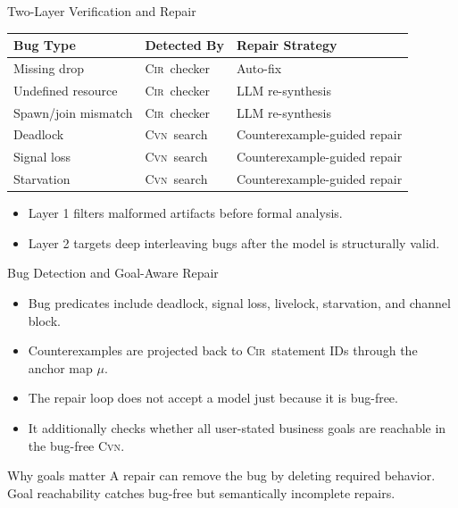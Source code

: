 \documentclass[aspectratio=169]{beamer}
\newcommand{\Cir}{\textsc{Cir}}
\newcommand{\Cvn}{\textsc{Cvn}}
\begin{document}
\begin{frame}{Two-Layer Verification and Repair}
  \begin{table}
    \centering
    \footnotesize
    \begin{tabular}{@{}lll@{}}
      \toprule
      Bug Type & Detected By & Repair Strategy \\
      \midrule
      Missing drop & \Cir\ checker & Auto-fix \\
      Undefined resource & \Cir\ checker & LLM re-synthesis \\
      Spawn/join mismatch & \Cir\ checker & LLM re-synthesis \\
      Deadlock & \Cvn\ search & Counterexample-guided repair \\
      Signal loss & \Cvn\ search & Counterexample-guided repair \\
      Starvation & \Cvn\ search & Counterexample-guided repair \\
      \bottomrule
    \end{tabular}
  \end{table}
  \begin{itemize}
    \item Layer 1 filters malformed artifacts before formal analysis.
    \item Layer 2 targets deep interleaving bugs after the model is structurally valid.
  \end{itemize}
\end{frame}

\begin{frame}{Bug Detection and Goal-Aware Repair}
  \begin{itemize}
    \item Bug predicates include deadlock, signal loss, livelock, starvation, and channel block.
    \item Counterexamples are projected back to \Cir\ statement IDs through the anchor map $\mu$.
    \item The repair loop does not accept a model just because it is bug-free.
    \item It additionally checks whether all user-stated business goals are reachable in the bug-free \Cvn.
  \end{itemize}
  \begin{block}{Why goals matter}
    A repair can remove the bug by deleting required behavior. Goal reachability catches bug-free but semantically incomplete repairs.
  \end{block}
\end{frame}
\end{document}
